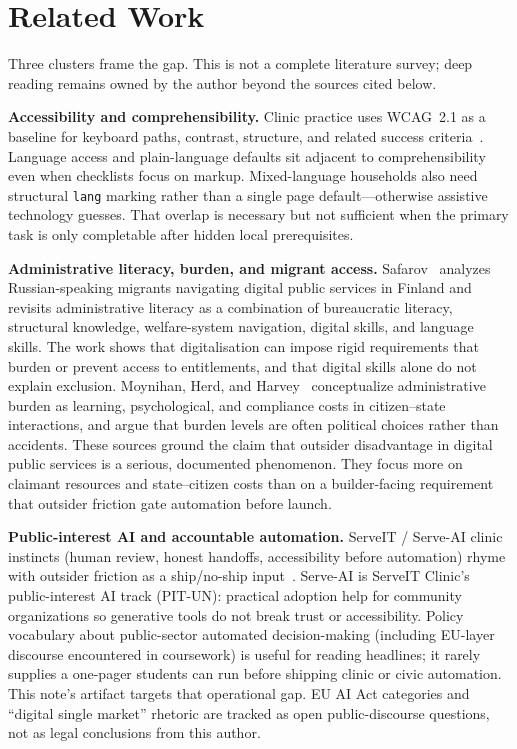 \documentclass[10pt,twocolumn]{article}
\begin{document}
\section{Related Work}
Three clusters frame the gap. This is not a complete literature survey; deep
reading remains owned by the author beyond the sources cited below.

\textbf{Accessibility and comprehensibility.} Clinic practice uses WCAG~2.1 as a
baseline for keyboard paths, contrast, structure, and related success
criteria~\cite{wcag21}. Language access and plain-language defaults sit adjacent
to comprehensibility even when checklists focus on markup. Mixed-language
households also need structural \texttt{lang} marking rather than a single page
default---otherwise assistive technology guesses. That overlap is necessary but
not sufficient when the primary task is only completable after hidden local
prerequisites.

\textbf{Administrative literacy, burden, and migrant access.} Safarov~\cite{safarov2023}
analyzes Russian-speaking migrants navigating digital public services in Finland
and revisits administrative literacy as a combination of bureaucratic literacy,
structural knowledge, welfare-system navigation, digital skills, and language
skills. The work shows that digitalisation can impose rigid requirements that
burden or prevent access to entitlements, and that digital skills alone do not
explain exclusion. Moynihan, Herd, and Harvey~\cite{moynihan2015} conceptualize
administrative burden as learning, psychological, and compliance costs in
citizen--state interactions, and argue that burden levels are often political
choices rather than accidents. These sources ground the claim that outsider
disadvantage in digital public services is a serious, documented phenomenon.
They focus more on claimant resources and state--citizen costs than on a
builder-facing requirement that outsider friction gate automation before launch.

\textbf{Public-interest AI and accountable automation.} ServeIT / Serve-AI clinic
instincts (human review, honest handoffs, accessibility before automation)
rhyme with outsider friction as a ship/no-ship input~\cite{serveai,serveit}.
Serve-AI is ServeIT Clinic's public-interest AI track (PIT-UN): practical
adoption help for community organizations so generative tools do not break trust
or accessibility. Policy vocabulary about public-sector automated
decision-making (including EU-layer discourse encountered in coursework) is
useful for reading headlines; it rarely supplies a one-pager students can run
before shipping clinic or civic automation. This note's artifact targets that
operational gap. EU AI Act categories and ``digital single market'' rhetoric are
tracked as open public-discourse questions, not as legal conclusions from this
author.
\end{document}
